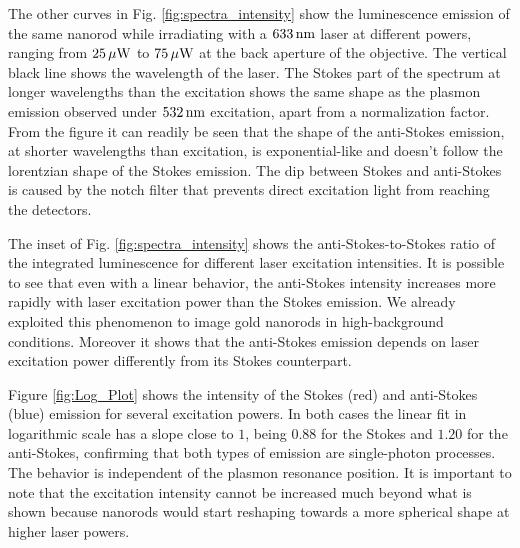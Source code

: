 The other curves in Fig. \ref{fig:spectra_intensity} show the luminescence emission of
the same nanorod while irradiating with a $633\,\textrm{nm}$ laser at different powers,
ranging from $25\,\mu\textrm{W}$ to $75\,\mu\textrm{W}$ at the back aperture of the objective. The
vertical black line shows the wavelength of the laser. The Stokes part of the
spectrum at longer wavelengths than the excitation shows the same shape as the
plasmon emission observed under $532\,\textrm{nm}$ excitation, apart from a normalization
factor. From the figure it can readily be seen that the shape of the anti-Stokes
emission, at shorter wavelengths than excitation, is exponential-like and
doesn't follow the lorentzian shape of the Stokes emission. The dip between
Stokes and anti-Stokes is caused by the notch filter that prevents direct
excitation light from reaching the detectors.

The inset of Fig. \ref{fig:spectra_intensity} shows the anti-Stokes-to-Stokes ratio of
the integrated luminescence for different laser excitation intensities. It is
possible to see that even with a linear behavior, the anti-Stokes intensity
increases more rapidly with laser excitation power than the Stokes emission.
We already exploited this phenomenon to image gold nanorods in high-background
conditions\cite{Carattino2016a}. Moreover it shows that the anti-Stokes emission
depends on laser excitation power differently from its Stokes counterpart. 

Figure \ref{fig:Log_Plot} shows the intensity of the Stokes (red) and
anti-Stokes (blue) emission for several excitation powers. In both cases the
linear fit in logarithmic scale has a slope close to $1$, being $0.88$ for the
Stokes and $1.20$ for the anti-Stokes, confirming that both types of emission
are single-photon processes. The behavior is independent of the plasmon
resonance position. It is important to note that the excitation intensity cannot
be increased much beyond what is shown because nanorods would start reshaping
towards a more spherical shape at higher laser powers.

